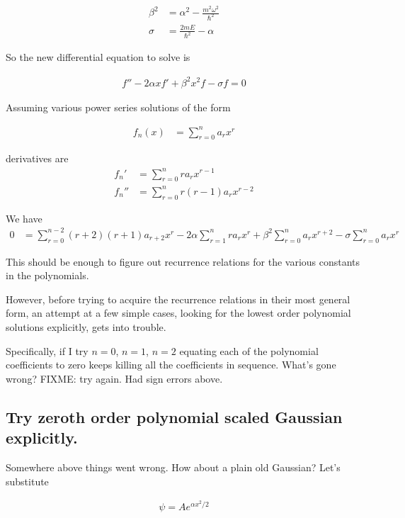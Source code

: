 \begin{align*}
\beta^2 &= \alpha^2 - \frac{m^2 \omega^2}{\hbar^2}  \\
\sigma &= \frac{2 m E}{\hbar^2} - \alpha 
\end{align*}

So the new differential equation to solve is

\begin{align}
f'' - 2 \alpha x f' + \beta^2 x^2 f - \sigma f = 0
\end{align}

Assuming various power series solutions of the form

\begin{align*}
f_n(x) &= \sum_{r=0}^n a_r x^r
\end{align*}

derivatives are
\begin{align*}
f_n' &= \sum_{r=0}^n r a_r x^{r-1} \\
f_n'' &= \sum_{r=0}^n r(r-1) a_r x^{r-2}
\end{align*}

We have 
\begin{align*}
0 &= \sum_{r=0}^{n-2} (r+2)(r+1) a_{r+2} x^{r}
 - 2 \alpha \sum_{r=1}^n r a_r x^{r}
+ \beta^2
\sum_{r=0}^n a_r x^{r+2} 
- \sigma \sum_{r=0}^n a_r x^r
\end{align*}

This should be enough to figure out recurrence relations for the various constants in the polynomials.

However, before trying to acquire the recurrence relations in their most general form, an attempt at a few simple cases, looking for the lowest order
polynomial solutions explicitly, gets into trouble.

Specifically, if I try $n=0$, $n=1$, $n=2$ equating each of the polynomial coefficients to zero keeps killing all the coefficients in sequence.  What's 
gone wrong?  FIXME: try again.  Had sign errors above.

\subsection{Try zeroth order polynomial scaled Gaussian explicitly. }

Somewhere above things went wrong.  How about a plain old Gaussian?  Let's substitute 

\begin{align*}
\psi = A e^{\alpha x^2/2}
\end{align*}

